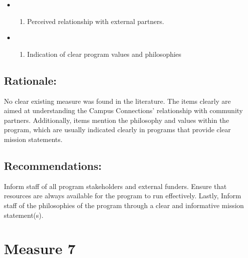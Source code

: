 \documentclass[]{article}
\providecommand{\tightlist}{%
  \setlength{\itemsep}{0pt}\setlength{\parskip}{0pt}}
\begin{document}
\begin{itemize}
\item
  \begin{enumerate}
  \def\labelenumi{\arabic{enumi}.}
  \tightlist
  \item
    Perceived relationship with external partners.
  \end{enumerate}
\item
  \begin{enumerate}
  \def\labelenumi{\arabic{enumi}.}
  \setcounter{enumi}{1}
  \tightlist
  \item
    Indication of clear program values and philosophies
  \end{enumerate}
\end{itemize}

\subsection{\texorpdfstring{\textbf{Rationale}:}{Rationale:}}\label{rationale-5}

No clear existing measure was found in the literature. The items clearly
are aimed at understanding the Campus Connections' relationship with
community partners. Additionally, items mention the philosophy and
values within the program, which are usually indicated clearly in
programs that provide clear mission statements.

\subsection{\texorpdfstring{\textbf{Recommendations}:}{Recommendations:}}\label{recommendations-5}

Inform staff of all program stakeholders and external funders. Ensure
that resources are always available for the program to run effectively.
Lastly, Inform staff of the philosophies of the program through a clear
and informative mission statement(s).

\section{Measure 7}\label{measure-7}
\end{document}
